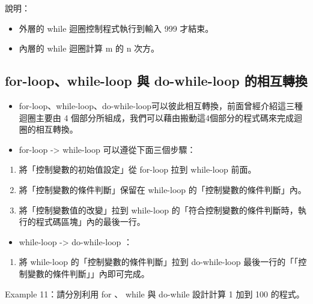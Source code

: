 \documentclass[a4paper,12pt,english]{sphinxmanual}
\begin{document}
說明：
\begin{itemize}
\item {} 
外層的 while 迴圈控制程式執行到輸入 999 才結束。

\item {} 
內層的 while 迴圈計算 m 的 n 次方。

\end{itemize}


\subsection{for-loop、while-loop 與 do-while-loop 的相互轉換}
\label{java_loop:for-loopwhile-loop-do-while-loop}\begin{itemize}
\item {} 
for-loop、while-loop、do-while-loop可以彼此相互轉換，前面曾經介紹這三種迴圈主要由 4 個部分所組成，我們可以藉由搬動這4個部分的程式碼來完成迴圈的相互轉換。

\item {} 
for-loop -\textgreater{} while-loop 可以遵從下面三個步驟：

\end{itemize}
\begin{enumerate}
\item {} 
將「控制變數的初始值設定」從 for-loop 拉到 while-loop 前面。

\item {} 
將「控制變數的條件判斷」保留在 while-loop 的「控制變數的條件判斷」內。

\item {} 
將「控制變數值的改變」拉到 while-loop 的「符合控制變數的條件判斷時，執行的程式碼區塊」內的最後一行。

\end{enumerate}
\begin{itemize}
\item {} 
while-loop -\textgreater{} do-while-loop ：

\end{itemize}
\begin{enumerate}
\item {} 
將 while-loop 的「控制變數的條件判斷」拉到 do-while-loop 最後一行的「「控制變數的條件判斷」」內即可完成。

\end{enumerate}

Example 11：請分別利用 for 、 while 與 do-while 設計計算 1 加到 100 的程式。
\end{document}
